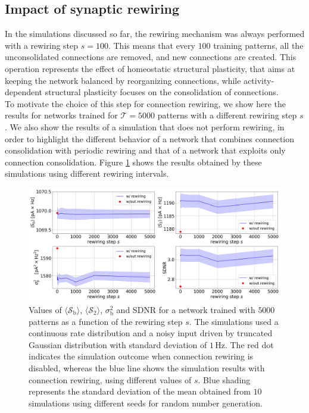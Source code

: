 \documentclass[a4paper, 12pt, twoside, openright]{book}
\newcommand{\T}{\mathcal{T}}
\newcommand{\SII}{\mathcal{S}_\text{2}}
\newcommand{\Sb}{\mathcal{S}_\text{b}}
\newcommand{\varSb}{\sigma^{2}_\text{b}}
\begin{document}
\subsection{Impact of synaptic rewiring}
In the simulations discussed so far, the rewiring mechanism was always performed with
a rewiring step $s=100$.
This means that every $100$ training patterns,
all the unconsolidated connections are removed, and new connections are created.
This operation represents the effect of homeostatic structural plasticity, that aims at keeping the network balanced by reorganizing connections, while activity-dependent structural plasticity focuses on the consolidation of connections.\\
To motivate the choice of this step for connection rewiring, we show here the results for networks trained for $\T=5000$ patterns with a different rewiring step $s$.
We also show the results of a simulation that does not perform rewiring, in order to highlight
the different behavior of a network that combines connection consolidation with periodic rewiring and that of a network that exploits only connection consolidation.
Figure \ref{fig:t_study} shows the results obtained by these simulations using different rewiring intervals. 

\begin{figure}[t]
    \centering\includegraphics[width=\columnwidth]{figures/t_study.png}
	\caption{ 
    Values of $\langle\Sb\rangle$, $\langle\SII\rangle$, $\varSb$ and SDNR
    for a network trained with $5000$ patterns as a function of the rewiring step $s$. 
    The simulations used a continuous rate distribution and a noisy input driven by truncated Gaussian distribution with standard deviation of $1$\,Hz. The red dot indicates the simulation outcome when connection rewiring is disabled, whereas the blue line shows the simulation results with connection rewiring, using different values of $s$. Blue shading represents the standard deviation of the mean obtained from $10$ simulations using different seeds for random number generation.
	\label{fig:t_study}}
\end{figure}
\end{document}
